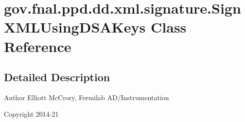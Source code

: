 \hypertarget{classgov_1_1fnal_1_1ppd_1_1dd_1_1xml_1_1signature_1_1SignXMLUsingDSAKeys}{\section{gov.\-fnal.\-ppd.\-dd.\-xml.\-signature.\-Sign\-X\-M\-L\-Using\-D\-S\-A\-Keys Class Reference}
\label{classgov_1_1fnal_1_1ppd_1_1dd_1_1xml_1_1signature_1_1SignXMLUsingDSAKeys}
}


\subsection{Detailed Description}
\begin{DoxyAuthor}{Author}
Elliott Mc\-Crory, Fermilab A\-D/\-Instrumentation 
\end{DoxyAuthor}
\begin{DoxyCopyright}{Copyright}
2014-\/21 
\end{DoxyCopyright}
